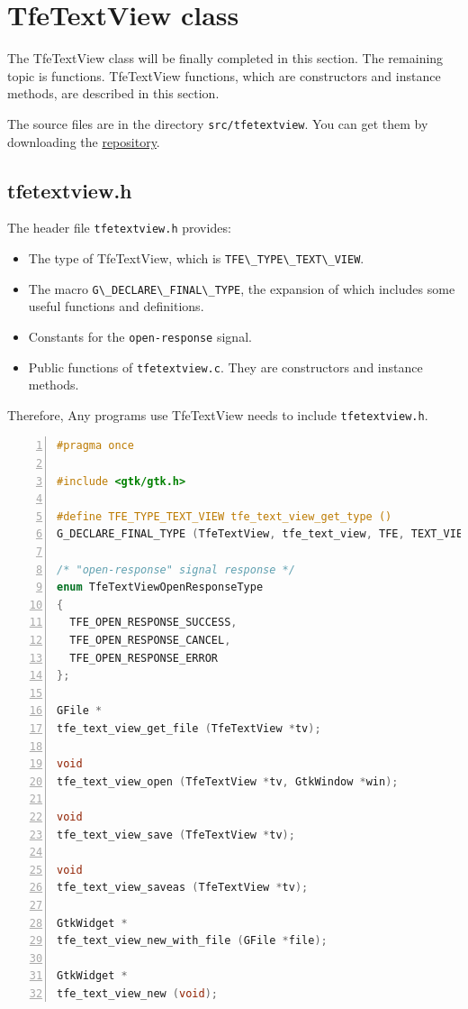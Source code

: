 \section{TfeTextView class}\label{tfetextview-class}

The TfeTextView class will be finally completed in this section. The
remaining topic is functions. TfeTextView functions, which are
constructors and instance methods, are described in this section.

The source files are in the directory
\passthrough{\lstinline!src/tfetextview!}. You can get them by
downloading the
\href{https://github.com/ToshioCP/Gtk4-tutorial}{repository}.

\subsection{tfetextview.h}\label{tfetextview.h}

The header file \passthrough{\lstinline!tfetextview.h!} provides:

\begin{itemize}
\tightlist
\item
  The type of TfeTextView, which is
  \passthrough{\lstinline!TFE\_TYPE\_TEXT\_VIEW!}.
\item
  The macro \passthrough{\lstinline!G\_DECLARE\_FINAL\_TYPE!}, the
  expansion of which includes some useful functions and definitions.
\item
  Constants for the \passthrough{\lstinline!open-response!} signal.
\item
  Public functions of \passthrough{\lstinline!tfetextview.c!}. They are
  constructors and instance methods.
\end{itemize}

Therefore, Any programs use TfeTextView needs to include
\passthrough{\lstinline!tfetextview.h!}.

\begin{lstlisting}[language=C, numbers=left]
#pragma once

#include <gtk/gtk.h>

#define TFE_TYPE_TEXT_VIEW tfe_text_view_get_type ()
G_DECLARE_FINAL_TYPE (TfeTextView, tfe_text_view, TFE, TEXT_VIEW, GtkTextView)

/* "open-response" signal response */
enum TfeTextViewOpenResponseType
{
  TFE_OPEN_RESPONSE_SUCCESS,
  TFE_OPEN_RESPONSE_CANCEL,
  TFE_OPEN_RESPONSE_ERROR
};

GFile *
tfe_text_view_get_file (TfeTextView *tv);

void
tfe_text_view_open (TfeTextView *tv, GtkWindow *win);

void
tfe_text_view_save (TfeTextView *tv);

void
tfe_text_view_saveas (TfeTextView *tv);

GtkWidget *
tfe_text_view_new_with_file (GFile *file);

GtkWidget *
tfe_text_view_new (void);
\end{lstlisting}

